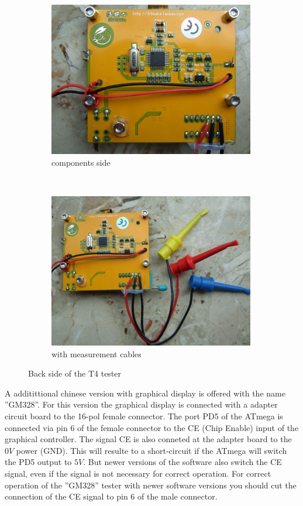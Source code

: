 \begin{figure}[H]
  \begin{subfigure}[b]{9cm}
    \centering
    \includegraphics[width=9cm]{../PNG/T4_back.JPG}
    \caption{components side}
  \end{subfigure}
  ~
  \begin{subfigure}[b]{9cm}
    \centering
    \includegraphics[width=9cm]{../PNG/T4_back_clips.JPG}
    \caption{with measurement cables}
  \end{subfigure}
  \caption{Back side of the T4 tester}
  \label{fig:T4_back}
\end{figure}

A additittional chinese version with graphical display is offered with the name ''GM328''.
For this version the graphical display is connected with a adapter circuit board to the 16-pol female connector. 
The port PD5 of the ATmega is connected via pin 6 of the female connector to the CE (Chip Enable) input of the 
graphical controller.
The signal CE is also conneted at the adapter board to the \(0V\) power (GND).
This will resulte to a short-circuit if the ATmega will switch the PD5 output to \(5V\).
But newer versions of the software also switch the CE signal, even if the signal is not necessary for
correct operation.
For correct operation of the ''GM328'' tester with newer software versions you should cut the
connection of the CE signal to pin 6 of the male connector.


